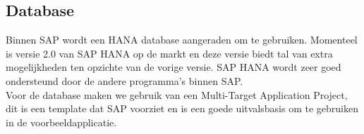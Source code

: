         \subsection{Database}
        Binnen SAP wordt een HANA database aangeraden om te gebruiken. Momenteel is versie 2.0 van SAP HANA op de markt en deze versie biedt tal van extra mogelijkheden ten opzichte van de vorige versie. SAP HANA wordt zeer goed ondersteund door de andere programma's binnen SAP.\\
        Voor de database maken we gebruik van een Multi-Target Application Project, dit is een template dat SAP voorziet en is een goede uitvalsbasis om te gebruiken in de voorbeeldapplicatie.
        
%            
            
